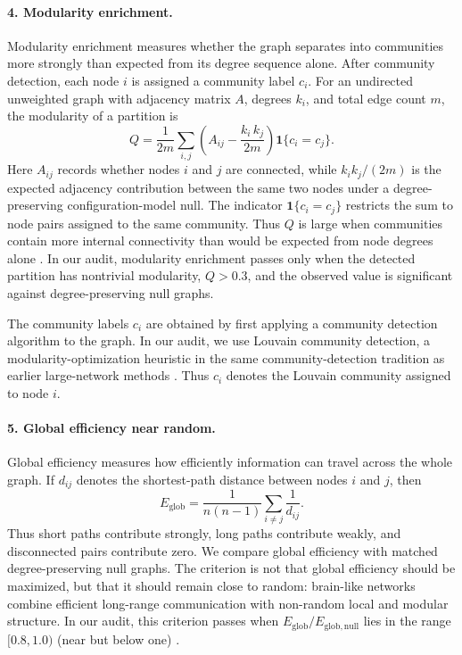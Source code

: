 \documentclass[12pt]{article}
\begin{document}
\paragraph{4. Modularity enrichment.}
Modularity enrichment measures whether the graph separates into
communities more strongly than expected from its degree sequence alone.
After community detection, each node $i$ is assigned a community label
$c_i$. For an undirected unweighted graph with adjacency matrix $A$,
degrees $k_i$, and total edge count $m$, the modularity of a partition is
\[
Q =
\frac{1}{2m}
\sum_{i,j}
\left(
A_{ij} - \frac{k_i\,k_j}{2m}
\right)
\mathbf{1}\{c_i=c_j\}.
\]
Here $A_{ij}$ records whether nodes $i$ and $j$ are connected, while
$k_i k_j/(2m)$ is the expected adjacency contribution between the same
two nodes under a degree-preserving configuration-model null. The
indicator $\mathbf{1}\{c_i=c_j\}$ restricts the sum to node pairs assigned
to the same community. Thus $Q$ is large when communities contain more
internal connectivity than would be expected from node degrees alone
\cite{NewmanGirvan2004}. In our audit, modularity enrichment passes only
when the detected partition has nontrivial modularity, $Q>0.3$, and the
observed value is significant against degree-preserving null graphs.



The community labels \(c_i\) are obtained by first applying a community
detection algorithm to the graph.  In our audit, we use Louvain community
detection, a modularity-optimization heuristic in the same community-detection
tradition as earlier large-network methods
\cite{ClausetNewmanMoore2004,Blondel2008}.  Thus \(c_i\) denotes the
Louvain community assigned to node \(i\).



\paragraph{5. Global efficiency near random.}
Global efficiency measures how efficiently information can travel across
the whole graph. If $d_{ij}$ denotes the shortest-path distance between
nodes $i$ and $j$, then
\[
E_{\mathrm{glob}}
=
\frac{1}{n(n-1)}
\sum_{i\neq j}
\frac{1}{d_{ij}} .
\]
Thus short paths contribute strongly, long paths contribute weakly, and
disconnected pairs contribute zero. We compare global efficiency with
matched degree-preserving null graphs. The criterion is not that global
efficiency should be maximized, but that it should remain close to random:
brain-like networks combine efficient long-range communication with
non-random local and modular structure. In our audit, this criterion
passes when $E_{\mathrm{glob}}/E_{\mathrm{glob,null}}$ lies in the range $[0.8,1.0)$ (near but below one) \cite{LatoraMarchiori2001,IturriaMedina2008}.
\end{document}
